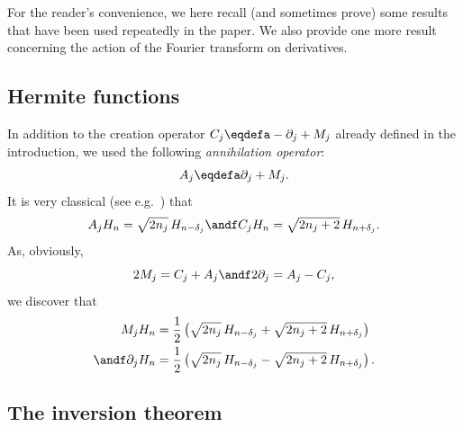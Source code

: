 For the reader's convenience, we here recall (and sometimes prove) some results that have been used repeatedly in the paper. We also provide one more result concerning the action of the Fourier transform on derivatives.

\subsection{Hermite functions}

In addition to the creation operator $C_j \eqdefa -\partial_j+M_j$ already defined in the introduction, we used the following \emph{annihilation operator}:
\begin{equation}\label{definCreaAnnhil}
A_j \eqdefa \partial_j+M_j.
\end{equation}
It is very classical (see e.g.~\cite{O}) that
\begin{equation}\label{relationsHHermiteCA}
A_j H_{n} = \sqrt {2n_j}\, H_{n-\delta_j} \andf C_j H_n = \sqrt {2n_j+2}\, H_{n+\delta_j}.
\end{equation}
As, obviously,
\begin{equation}\label{Mjdj}
2M_j =C_j+A_j \andf 2\partial_j =A_j-C_j,
\end{equation}
we discover that
\begin{equation}\label{relationsHHermiteCAb}
\begin{aligned}
M_j H_{n} &= \frac 12 \left(\sqrt {2n_j} \,H_{n-\delta_j}+\sqrt {2n_j+2}\, H_{n+\delta_j}\right) \\
\andf \partial_j H_n &= \frac 12\left (\sqrt {2n_j}\, H_{n-\delta_j}- \sqrt {2n_j+2}\, H_{n+\delta_j}\right).
\end{aligned}
\end{equation}

\subsection{The inversion theorem}

